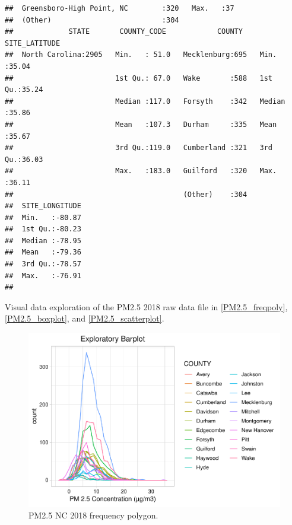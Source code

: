 \documentclass[12pt,]{article}
\begin{document}
\begin{verbatim}
##  Greensboro-High Point, NC        :320   Max.   :37  
##  (Other)                          :304               
##             STATE       COUNTY_CODE            COUNTY    SITE_LATITUDE  
##  North Carolina:2905   Min.   : 51.0   Mecklenburg:695   Min.   :35.04  
##                        1st Qu.: 67.0   Wake       :588   1st Qu.:35.24  
##                        Median :117.0   Forsyth    :342   Median :35.86  
##                        Mean   :107.3   Durham     :335   Mean   :35.67  
##                        3rd Qu.:119.0   Cumberland :321   3rd Qu.:36.03  
##                        Max.   :183.0   Guilford   :320   Max.   :36.11  
##                                        (Other)    :304                  
##  SITE_LONGITUDE  
##  Min.   :-80.87  
##  1st Qu.:-80.23  
##  Median :-78.95  
##  Mean   :-79.36  
##  3rd Qu.:-78.57  
##  Max.   :-76.91  
## 
\end{verbatim}

Visual data exploration of the PM2.5 2018 raw data file in
\autoref{PM2.5_freqpoly}, \autoref{PM2.5_boxplot}, and
\autoref{PM2.5_scatterplot}.

\newpage

\begin{figure}
\centering
\includegraphics{Raby_ENV872_Project_files/figure-latex/unnamed-chunk-11-1.pdf}
\caption{PM2.5 NC 2018 frequency polygon. \label{PM2.5_freqpoly}}
\end{figure}

\newpage
\end{document}

